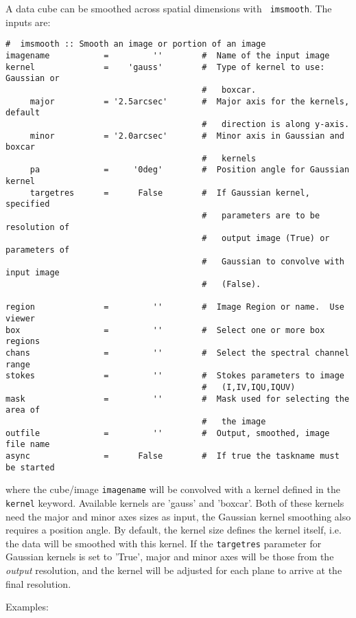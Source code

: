 A data cube can be smoothed across spatial dimensions with {\tt
  imsmooth}. The inputs are:\\ 
\small
\begin{verbatim}
#  imsmooth :: Smooth an image or portion of an image
imagename           =         ''        #  Name of the input image
kernel              =    'gauss'        #  Type of kernel to use: Gaussian or
                                        #   boxcar.
     major          = '2.5arcsec'       #  Major axis for the kernels, default
                                        #   direction is along y-axis.
     minor          = '2.0arcsec'       #  Minor axis in Gaussian and boxcar
                                        #   kernels
     pa             =     '0deg'        #  Position angle for Gaussian kernel
     targetres      =      False        #  If Gaussian kernel, specified
                                        #   parameters are to be resolution of
                                        #   output image (True) or parameters of
                                        #   Gaussian to convolve with input image
                                        #   (False).

region              =         ''        #  Image Region or name.  Use viewer
box                 =         ''        #  Select one or more box regions
chans               =         ''        #  Select the spectral channel range
stokes              =         ''        #  Stokes parameters to image
                                        #   (I,IV,IQU,IQUV)
mask                =         ''        #  Mask used for selecting the area of
                                        #   the image
outfile             =         ''        #  Output, smoothed, image file name
async               =      False        #  If true the taskname must be started
\end{verbatim}
\normalsize
where the cube/image {\tt imagename} will be convolved with a kernel
defined in the {\tt kernel} keyword. Available kernels are 'gauss' and
'boxcar'. Both of these kernels need the major and minor axes sizes as
input, the Gaussian kernel smoothing also requires a position
angle. By default, the kernel size defines the kernel itself, i.e. the
data will be smoothed with this kernel. If the {\tt targetres} parameter
for Gaussian kernels is set to 'True', major and minor axes will be
those from the {\it output} resolution, and the kernel will be
adjusted for each plane to arrive at the final resolution. 

Examples: \\

